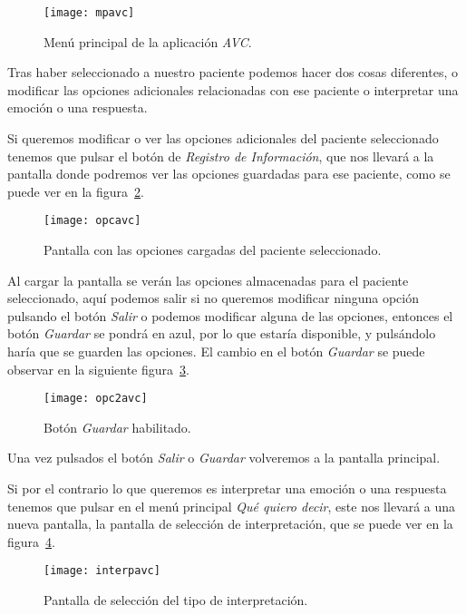 \begin{figure}[H]
	\centering
	\texttt{[image: mpavc]}
	\caption{Menú principal de la aplicación \textit{AVC}.}
	\label{fig:mpavc}
\end{figure}

Tras haber seleccionado a nuestro paciente podemos hacer dos cosas diferentes, o modificar las opciones adicionales relacionadas con ese paciente o interpretar una emoción o una respuesta.

Si queremos modificar o ver las opciones adicionales del paciente seleccionado tenemos que pulsar el botón de \textit{Registro de Información}, que nos llevará a la pantalla donde podremos ver las opciones guardadas para ese paciente, como se puede ver en la figura~\ref{fig:opcavc}.

\begin{figure}[htp]
	\centering
	\texttt{[image: opcavc]}
	\caption{Pantalla con las opciones cargadas del paciente seleccionado.}
	\label{fig:opcavc}
\end{figure}

Al cargar la pantalla se verán las opciones almacenadas para el paciente seleccionado, aquí podemos salir si no queremos modificar ninguna opción pulsando el botón \textit{Salir} o podemos modificar alguna de las opciones, entonces el botón \textit{Guardar} se pondrá en azul, por lo que estaría disponible, y pulsándolo haría que se guarden las opciones. El cambio en el botón \textit{Guardar} se puede observar en la siguiente figura~\ref{fig:opc2avc}.

\begin{figure}[htp]
	\centering
	\texttt{[image: opc2avc]}
	\caption{Botón \textit{Guardar} habilitado.}
	\label{fig:opc2avc}
\end{figure}

Una vez pulsados el botón \textit{Salir} o \textit{Guardar} volveremos a la pantalla principal.

Si por el contrario lo que queremos es interpretar una emoción o una respuesta tenemos que pulsar en el menú principal \textit{Qué quiero decir}, este nos llevará a una nueva pantalla, la pantalla de selección de interpretación, que se puede ver en la figura~\ref{fig:interpavc}.

\begin{figure}[htp]
	\centering
	\texttt{[image: interpavc]}
	\caption{Pantalla de selección del tipo de interpretación.}
	\label{fig:interpavc}
\end{figure}


